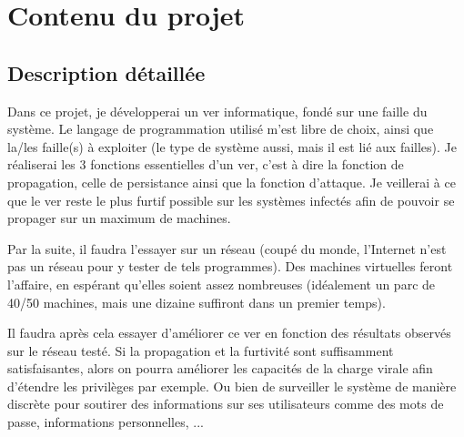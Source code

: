 \documentclass[]{projet-M1}
\begin{document}
\section{Contenu du projet}
\subsection{Description détaillée}
Dans ce projet, je développerai un ver informatique, fondé sur une \gls{faille} du système. Le langage de programmation utilisé m'est libre de choix, ainsi que la/les \gls{faille}(s) à exploiter (le type de système aussi, mais il est lié aux \glspl{faille}). Je réaliserai les 3 fonctions essentielles d'un ver, c'est à dire la fonction de propagation, celle de persistance ainsi que la fonction d'attaque. Je veillerai à ce que le ver reste le plus furtif possible sur les systèmes infectés afin de pouvoir se propager sur un maximum de machines.

Par la suite, il faudra l'essayer sur un réseau (coupé du monde, l'Internet n'est pas un réseau pour y tester de tels programmes). Des machines virtuelles feront l'affaire, en espérant qu'elles soient assez nombreuses (idéalement un parc de 40/50 machines, mais une dizaine suffiront dans un premier temps).

Il faudra après cela essayer d'améliorer ce ver en fonction des résultats observés sur le réseau testé. Si la propagation et la furtivité sont suffisamment satisfaisantes, alors on pourra améliorer les capacités de la \gls{charge virale} afin d'étendre les privilèges par exemple. Ou bien de surveiller le système de manière discrète pour soutirer des informations sur ses utilisateurs comme des mots de passe, informations personnelles, ...
\end{document}
